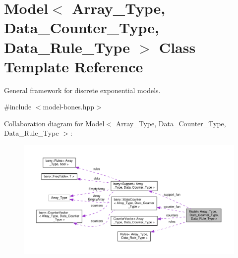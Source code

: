 \hypertarget{class_model}{}\section{Model$<$ Array\+\_\+\+Type, Data\+\_\+\+Counter\+\_\+\+Type, Data\+\_\+\+Rule\+\_\+\+Type $>$ Class Template Reference}
\label{class_model}


General framework for discrete exponential models.  




{\ttfamily \#include $<$model-\/bones.\+hpp$>$}



Collaboration diagram for Model$<$ Array\+\_\+\+Type, Data\+\_\+\+Counter\+\_\+\+Type, Data\+\_\+\+Rule\+\_\+\+Type $>$\+:\nopagebreak
\begin{figure}[H]
\begin{center}
\leavevmode
\includegraphics[width=350pt]{class_model__coll__graph}
\end{center}
\end{figure}
